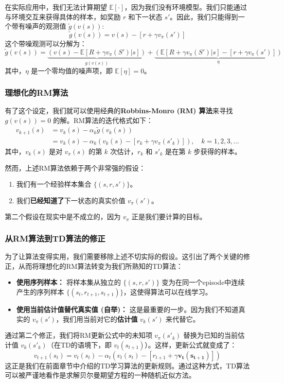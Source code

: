 \documentclass[12pt, a4paper]{article}
\begin{document}
在实际应用中，我们无法计算期望 $\mathbb{E}[\cdot]$，因为我们没有环境模型。我们只能通过与环境交互来获得具体的样本，如奖励 $r$ 和下一状态 $s'$。因此，我们只能得到一个带有噪声的观测值 $\tilde{g}(v(s))$:
\[
\tilde{g}(v(s)) = v(s) - [r + \gamma v_\pi(s')]
\]
这个带噪观测可以分解为：
\[
\tilde{g}(v(s)) = \underbrace{\left(v(s) - \mathbb{E}[R + \gamma v_\pi(S')|s]\right)}_{g(v(s))} + \underbrace{\left(\mathbb{E}[R + \gamma v_\pi(S')|s] - [r + \gamma v_\pi(s')]\right)}_{\eta}
\]
其中，$\eta$ 是一个零均值的噪声项，即 $\mathbb{E}[\eta]=0$。

\subsubsection{理想化的RM算法}
有了这个设定，我们就可以使用经典的\textbf{Robbins-Monro (RM) 算法}来寻找 $g(v(s))=0$ 的解。RM算法的迭代格式如下：
\begin{align}
v_{k+1}(s) &= v_k(s) - \alpha_k \tilde{g}(v_k(s)) \nonumber \\
           &= v_k(s) - \alpha_k \left( v_k(s) - [r_k + \gamma v_\pi(s'_k)] \right), \quad k=1,2,3,\dots
\end{align}
其中，$v_k(s)$ 是对 $v_\pi(s)$ 的第 $k$ 次估计，$r_k$ 和 $s'_k$ 是在第 $k$ 步获得的样本。

然而，上述RM算法依赖于两个非常强的假设：
\begin{enumerate}
    \item 我们有一个经验样本集合 $\{(s, r, s')\}$。
    \item 我们\textbf{已经知道了}下一状态的真实价值 $v_\pi(s')$。
\end{enumerate}
第二个假设在现实中是不成立的，因为 $v_\pi$ 正是我们要计算的目标。

\subsubsection{从RM算法到TD算法的修正}
为了让算法变得实用，我们需要移除上述不切实际的假设。这引出了两个关键的修正，从而将理想化的RM算法转变为我们所熟知的TD算法：
\begin{itemize}
    \item \textbf{使用序列样本：} 将样本集从独立的 $\{(s,r,s')\}$ 变为在同一个episode中连续产生的序列样本 $\{(s_t, r_{t+1}, s_{t+1})\}$，这使得算法可以在线学习。
    \item \textbf{使用当前估计值替代真实值 (自举)：} 这是最重要的一步。因为我们不知道真实的 $v_\pi(s')$，我们用当前对它的\textbf{估计值} $v_k(s')$ 来代替它。
\end{itemize}

通过第二个修正，我们将RM更新公式中的未知项 $v_\pi(s'_k)$ 替换为已知的当前估计值 $v_k(s'_k)$（在TD的语境下，即 $v_t(s_{t+1})$）。这样，更新公式就变成了：
\[
v_{t+1}(s_t) = v_t(s_t) - \alpha_t \left( v_t(s_t) - [r_{t+1} + \gamma \boldsymbol{v_t(s_{t+1})}] \right)
\]
这正是我们在前面章节中介绍的TD学习算法的更新规则。通过这种方式，TD算法可以被严谨地看作是求解贝尔曼期望方程的一种随机近似方法。
\end{document}

